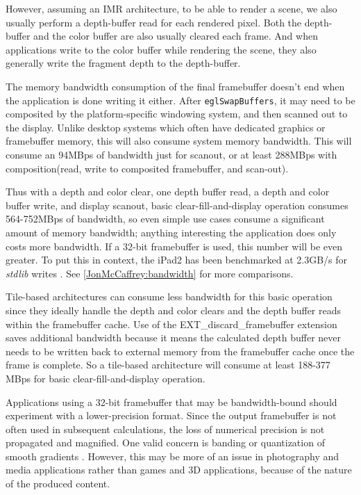  

However, assuming an IMR architecture, to be able to render a scene, we also
usually perform a depth-buffer read for each rendered pixel.  Both the
depth-buffer and the color buffer are also usually cleared each frame.  And
when applications write to the color buffer while rendering the scene, they
also generally write the fragment depth to the depth-buffer.

The memory bandwidth consumption of the final framebuffer doesn't end when the
application is done writing it either.  After \texttt{eglSwapBuffers}, it may
need to be composited by the platform-specific windowing system, and then
scanned out to the display.  Unlike desktop systems which often have
dedicated graphics or framebuffer memory, this will also consume system memory
bandwidth.  This will consume an 94MBps of bandwidth just for
scanout, or at least 288MBps with composition(read, write to
composited framebuffer, and scan-out).


 Thus with a depth and color clear, one depth buffer read, a depth and color
 buffer write, and display scanout, basic clear-fill-and-display operation
 consumes 564-752MBps of bandwidth, so even simple use cases consume a
 significant amount of memory bandwidth; anything interesting the application
 does only costs more bandwidth. If a 32-bit framebuffer is used, this number
 will be even greater.  To put this in context, the iPad2 has been benchmarked
 at 2.3GB/s for \textit{stdlib} writes \cite{Shimpi11}.  See
 \ref{JonMcCaffrey:bandwidth} for more comparisons.

 Tile-based architectures can consume less bandwidth for this basic operation
 since they ideally handle the depth and color clears and the depth buffer
 reads within the framebuffer cache.  Use of the
 EXT\_discard\_framebuffer\cite{EXT_discard_framebuffer} extension saves
 additional bandwidth because it means the calculated depth buffer never needs
 to be written back to external memory from the framebuffer cache once the
 frame is complete. So a tile-based architecture will consume at least 188-377
 MBps for basic clear-fill-and-display operation.


Applications using a 32-bit framebuffer that may be bandwidth-bound should
experiment with a lower-precision format.  Since the output framebuffer is not
often used in subsequent calculations, the loss of numerical precision is not
propagated and magnified.  One valid concern is banding or quantization of
smooth gradients \cite{Guy10}.  However, this may be more of an issue in
photography and media applications rather than games and 3D applications,
because of the nature of the produced content.

